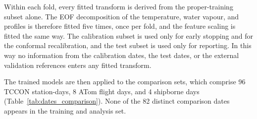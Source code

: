 Within each fold, every fitted transform is derived from the proper-training
subset alone. The EOF decomposition of the temperature, water vapour, and
 profiles is therefore fitted five times, once per fold, and the feature
scaling is fitted the same way. The calibration subset is used only for early
stopping and for the conformal recalibration, and the test subset is used only for
reporting. In this way no information from the calibration dates, the test dates,
or the external validation references enters any fitted transform.



The trained models are then applied to the comparison sets, which comprise 96
TCCON station-days, 8 ATom flight days, and 4 shipborne days
(Table~\ref{tab:dates_comparison}). None of the 82 distinct comparison dates
appears in the training and analysis set.